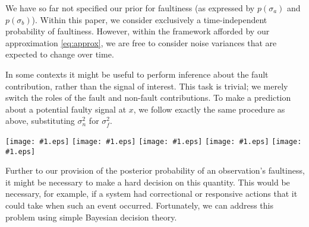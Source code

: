 \documentclass{article}
\newcommand{\psff}[1]{\texttt{[image: \#1.eps]}}
\begin{document}
We have so far not specified our prior for faultiness (as expressed by $p(\sigma_a)$ and $p(\sigma_b)$). Within this paper, we consider exclusively a time-independent probability of faultiness. However, within the framework afforded by our approximation \eqref{eq:approx}, we are free to consider noise variances that are expected to change over time.

In some contexts it might be useful to perform inference about the
fault contribution, rather than the signal of interest.  
This task is trivial; we merely switch the roles of the fault and non-fault
contributions.  To make a prediction about a potential faulty signal
at $x$, we follow exactly the same procedure as above, substituting
$\sigma_n^2$ for $\sigma_f^2$.

\begin{figure*}
  \centering
  \psff{painting}
  \psff{painting}
  \psff{painting}
  \psff{painting}
  \psff{painting}
  \label{test}
\end{figure*}

Further to our provision of the posterior probability of an
observation's faultiness, it might be necessary to make a hard
decision on this quantity. This would be necessary, for example, if a
system had correctional or responsive actions that it could take when
such an event occurred.  Fortunately, we can address this problem
using simple Bayesian decision theory.

\end{document}
